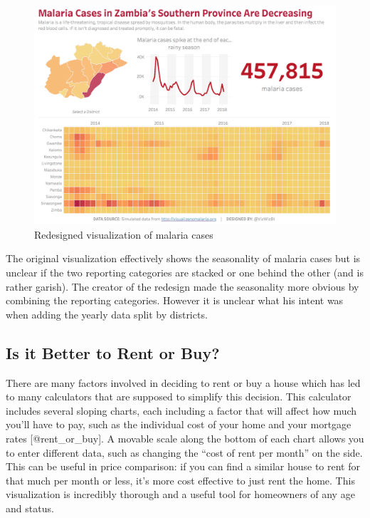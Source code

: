 \documentclass[]{book}
\theoremstyle{definition}
\theoremstyle{definition}
\theoremstyle{definition}
\theoremstyle{remark}
\begin{document}
\begin{figure}
\centering
\includegraphics{images/malaria_makeover.png}
\caption{Redesigned visualization of malaria cases}
\end{figure}

The original visualization effectively shows the seasonality of malaria
cases but is unclear if the two reporting categories are stacked or one
behind the other (and is rather garish). The creator of the redesign
made the seasonality more obvious by combining the reporting categories.
However it is unclear what his intent was when adding the yearly data
split by districts.

\subsection{Is it Better to Rent or
Buy?}\label{is-it-better-to-rent-or-buy}

There are many factors involved in deciding to rent or buy a house which
has led to many calculators that are supposed to simplify this decision.
This calculator includes several sloping charts, each including a factor
that will affect how much you'll have to pay, such as the individual
cost of your home and your mortgage rates {[}@rent\_or\_buy{]}. A
movable scale along the bottom of each chart allows you to enter
different data, such as changing the ``cost of rent per month'' on the
side. This can be useful in price comparison: if you can find a similar
house to rent for that much per month or less, it's more cost effective
to just rent the home. This visualization is incredibly thorough and a
useful tool for homeowners of any age and status.
\end{document}
